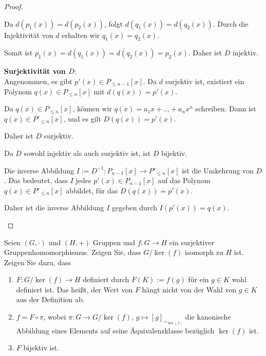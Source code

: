 \documentclass{../problemset}
\begin{document}
\begin{problem}
\begin{proof}
\begin{enumerate}
		      Da $d(p_1(x)) = d(p_2(x))$, folgt $d(q_1(x)) = d(q_2(x))$. Durch die Injektivität von $d$ erhalten wir $q_1(x) = q_2(x)$.

		      Somit ist $p_1(x) = d(q_1(x)) = d(q_2(x)) = p_2(x)$. Daher ist $D$ injektiv.
		      \checkmark

		      \textbf{Surjektivität von $D$}: \\
		      Angenommen, es gibt $p'(x) \in P_{\le n-1}[x]$. Da $d$ surjektiv ist, existiert ein Polynom $q(x) \in P_{\le n}[x]$ mit $d(q(x)) = p'(x)$.

		      Da $q(x) \in P_{\le n}[x]$, können wir $q(x) = a_1x + \ldots + a_nx^n$ schreiben. Dann ist $q(x) \in P'_{\le n}[x]$, und es gilt $D(q(x)) = p'(x)$.

		      Daher ist $D$ surjektiv.
		      \checkmark

		      Da $D$ sowohl injektiv als auch surjektiv ist, ist $D$ bijektiv.

		      Die inverse Abbildung $I := D^{-1}: P_{n-1}[x] \to P'_{\le n}[x]$ ist die Umkehrung von $D$. Das bedeutet, dass $I$ jedes $p'(x) \in P_{n-1}[x]$ auf das Polynom $q(x) \in P'_{\le n}[x]$ abbildet, für das $D(q(x)) = p'(x)$.

		      Daher ist die inverse Abbildung $I$ gegeben durch $I(p'(x)) = q(x)$.
	\end{enumerate}
\end{proof}

\end{problem}

\pagebreak

\begin{problem}
Seien $(G, \cdot)$ und $(H, +)$ Gruppen und $f: G \to H$ ein surjektiver Gruppenhomomorphismus. Zeigen Sie, dass $G/\ker(f)$ isomorph zu $H$ ist. Zeigen Sie dazu, dass
\begin{enumerate}
	\item $F: G/\ker(f) \to H$ definiert durch $F(K) := f(g)$ für ein $g \in K$ wohl definiert ist. Das heißt, der Wert von $F$ hängt nicht von der Wahl von $g \in K$ aus der Definition ab.
	\item $f = F \circ \pi$, wobei $\pi: G \to G/\ker(f)$, $g \mapsto [g]_{\sim_{\ker(f)}}$ die kanonische Abbildung eines Elements auf seine Äquivalenzklasse bezüglich $\ker(f)$ ist.
	\item $F$ bijektiv ist.
\end{enumerate}

\end{problem}
\end{document}

